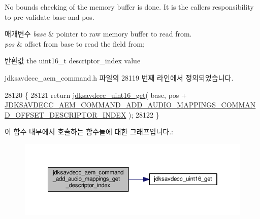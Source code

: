 No bounds checking of the memory buffer is done. It is the caller\textquotesingle{}s responsibility to pre-\/validate base and pos.


\begin{DoxyParams}{매개변수}
{\em base} & pointer to raw memory buffer to read from. \\
\hline
{\em pos} & offset from base to read the field from; \\
\hline
\end{DoxyParams}
\begin{DoxyReturn}{반환값}
the uint16\+\_\+t descriptor\+\_\+index value 
\end{DoxyReturn}


jdksavdecc\+\_\+aem\+\_\+command.\+h 파일의 28119 번째 라인에서 정의되었습니다.


\begin{DoxyCode}
28120 \{
28121     \textcolor{keywordflow}{return} \hyperlink{group__endian_ga3fbbbc20be954aa61e039872965b0dc9}{jdksavdecc\_uint16\_get}( base, pos + 
      \hyperlink{group__command__add__audio__mappings_ga3955b8927b9132617a2224610b232a67}{JDKSAVDECC\_AEM\_COMMAND\_ADD\_AUDIO\_MAPPINGS\_COMMAND\_OFFSET\_DESCRIPTOR\_INDEX}
       );
28122 \}
\end{DoxyCode}


이 함수 내부에서 호출하는 함수들에 대한 그래프입니다.\+:
\nopagebreak
\begin{figure}[H]
\begin{center}
\leavevmode
\includegraphics[width=350pt]{group__command__add__audio__mappings_gad1fbba911b4812ed813ce343d509dba6_cgraph}
\end{center}
\end{figure}





